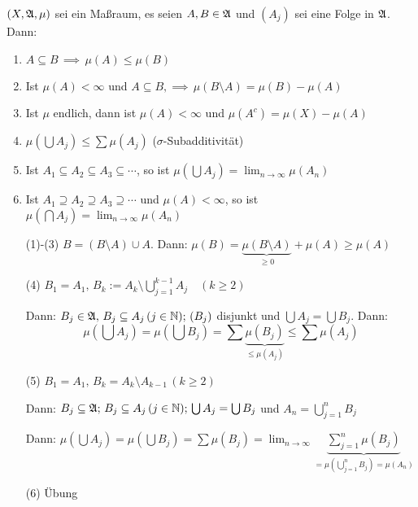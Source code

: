 \documentclass[a4paper,twoside,DIV15,BCOR12mm,chapterprefix=true,headings=onelinechapter]{scrbook}
\begin{document}
\begin{satz}
\label{Satz 1.7}
\((X,\mathfrak{A},\mu)\) sei ein Ma\ss raum, es seien \(A,B\in\mathfrak{A}\) und \((A_{j})\) sei eine Folge in \(\mathfrak{A}\). Dann:
\begin{enumerate}
\item \(A\subseteq B\,\implies\,\mu(A)\leq\mu(B)\)
\item Ist \(\mu(A)<\infty\) und \(A\subseteq B,\implies\,\mu(B\setminus A)=\mu(B)-\mu(A)\)
\item Ist \(\mu\) endlich, dann ist \(\mu(A)<\infty\) und \(\mu(A^{c})=\mu(X)-\mu(A)\)
\item \(\mu\left(\bigcup A_{j}\right)\leq\sum{\mu(A_{j})}\) (\(\sigma\)-Subadditivit\"at)
\item Ist \(A_{1}\subseteq A_{2}\subseteq A_{3}\subseteq\cdots\), so ist \(\mu(\bigcup A_{j})=\lim_{n\to\infty}{\mu(A_{n})}\)
\item Ist \(A_{1}\supseteq A_{2}\supseteq A_{3}\supseteq\cdots\) und \(\mu(A)<\infty\), so ist
	\(\mu(\bigcap A_{j})=\lim_{n\to\infty}{\mu(A_{n})}\)
\end{enumerate}
\end{satz}
\begin{beweis}
\begin{enumerate}
\item[(1)-(3)] \(B=(B\setminus A)\cup A\). Dann: \(\mu(B)=\underbrace{\mu(B\setminus A)}_{\geq0}+\mu(A)\geq\mu(A)\)
\item[(4)] %
\(B_{1}=A_{1},\,B_{k}:=A_{k}\setminus\bigcup_{j=1}^{k-1}{A_{j}}\quad(k\geq 2)\)

Dann: \(B_{j}\in\mathfrak{A},\,B_{j}\subseteq A_{j}\,(j\in\mathbb{N});\,(B_{j})\) disjunkt und \(\bigcup A_{j}=\bigcup B_{j}\). Dann:
\[
\mu\left(\bigcup A_{j}\right)=\mu\left(\bigcup B_{j}\right)=\sum{\underbrace{\mu(B_{j})}_{\leq\mu(A_{j})}}\leq\sum{\mu(A_{j})}
\]
\item[(5)] %
\(B_{1}=A_{1},\,B_{k}=A_{k}\setminus A_{k-1}\,(k\geq 2)\)

Dann: \(B_{j}\subseteq\mathfrak{A};\,B_{j}\subseteq A_{j}\,(j\in\mathbb{N});\,\bigcup A_{j}=\bigcup B_{j}\) und \(A_{n}=\bigcup_{j=1}^{n}{B_{j}}\)%

Dann: \(\mu(\bigcup A_{j})=\mu(\bigcup B_{j})=\sum{\mu(B_{j})}=\lim_{n\to\infty}{\underbrace{\sum_{j=1}^{n}{\mu(B_{j})}}_{=\mu\left(\bigcup_{j=1}^{n}{B_{j}}\right)=\mu(A_{n})}}\)
\item[(6)] \"Ubung
\end{enumerate}
\end{beweis}
\end{document}
